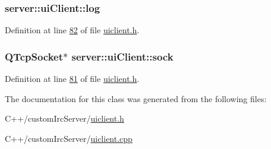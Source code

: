 \hypertarget{classserver_1_1ui_client_a446457889b90bd163b4d50fed2792cf0}{
\subsubsection[{log}]{ server\-::ui\-Client\-::log\hspace{0.3cm}{\ttfamily [private]}}}\label{dc/d4d/classserver_1_1ui_client_a446457889b90bd163b4d50fed2792cf0}


Definition at line \hyperlink{uiclient_8h_source_l00082}{82} of file \hyperlink{uiclient_8h_source}{uiclient.\-h}.

\hypertarget{classserver_1_1ui_client_af7c6a86556bf18c15c06692b636a2d1a}{
\subsubsection[{sock}]{\setlength{\rightskip}{0pt plus 5cm}Q\-Tcp\-Socket$\ast$ server\-::ui\-Client\-::sock\hspace{0.3cm}{\ttfamily [private]}}}\label{dc/d4d/classserver_1_1ui_client_af7c6a86556bf18c15c06692b636a2d1a}


Definition at line \hyperlink{uiclient_8h_source_l00081}{81} of file \hyperlink{uiclient_8h_source}{uiclient.\-h}.



The documentation for this class was generated from the following files\-:\begin{DoxyCompactItemize}
\item 
C++/custom\-Irc\-Server/\hyperlink{uiclient_8h}{uiclient.\-h}\item 
C++/custom\-Irc\-Server/\hyperlink{uiclient_8cpp}{uiclient.\-cpp}\end{DoxyCompactItemize}
